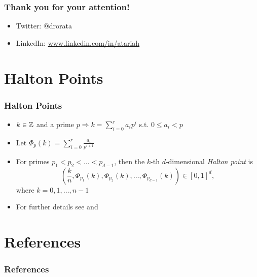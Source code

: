 \documentclass{beamer}
\begin{document}
\begin{frame}
  \frametitle{Thank you for your attention!}
  \begin{itemize}
  \item Twitter: @drorata
  \item LinkedIn: \url{www.linkedin.com/in/atariah}
  \end{itemize}
\end{frame}

\appendix
\nocite{*}
\section*{Halton Points}
\begin{frame}[label=app-halton]
  \frametitle{Halton Points}
  \begin{itemize}
  \item \(k \in \mathbb{Z}\) and a prime \(p \Rightarrow k = \sum_{i=0}^r a_i p^i\) s.t. \(0 \leq a_i < p\)
  \item Let \(\Phi_p(k) = \sum_{i=0}^r \frac{a_i}{p^{i+1}}\)
  \item For primes \(p_1 < p_2 < \ldots < p_{d-1}\), then the \(k\)-th \(d\)-dimensional \emph{Halton point} is %
    \[%
    \left( \frac{k}{n}, \Phi_{p_1}(k), \Phi_{p_2}(k), \ldots, \Phi_{p_{d-1}}(k) \right) \in [0,1]^d,
    \]%
    where \(k = 0,1,\ldots,n-1\)
  \item For further details see \cite{Wo97,Ch98} and \cite[\S~5.2]{La06}
\end{itemize}

  \hyperlink{main-cspace-pts-pick}{}
\end{frame}

\section*{References}
\begin{frame}[allowframebreaks]
  \frametitle{References}
  \printbibliography
\end{frame}
\end{document}
